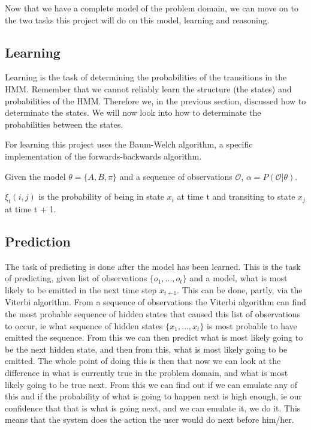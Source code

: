 Now that we have a complete model of the problem domain, we can move on to the two tasks this project will do on this model, learning and reasoning.

\subsection{Learning}
Learning is the task of determining the probabilities of the transitions in the HMM. Remember that we cannot reliably learn the structure (the states) and probabilities of the HMM. Therefore we, in the previous section, discussed how to determinate the states. We will now look into how to determinate the probabilities between the states.

For learning this project uses the Baum-Welch algorithm, a specific implementation of the forwards-backwards algorithm.

Given the model $\theta = \{A, B, \pi\}$ and a sequence of observations $\mathcal{O}$, $\alpha = P(\mathcal{O}|\theta)$.

$\xi_t (i, j)$ is the probability of being in state $x_i$ at time t and transiting to state $x_j$ at
time t + 1.



\subsection{Prediction}\label{sub:Prediction}
The task of predicting is done after the model has been learned. This is the task of predicting, given list of observations $\{o_1,\dots,o_t\}$ and a model, what is most likely to be emitted in the next time step $x_{t+1}$. This can be done, partly, via the Viterbi algorithm. From a sequence of observations the Viterbi algorithm can find the most probable sequence of hidden states that caused this list of observations to occur, ie what sequence of hidden states $\{x_1,\dots,x_t\}$ is most probable to have emitted the sequence. From this we can then predict what is most likely going to be the next hidden state, and then from this, what is most likely going to be emitted. The whole point of doing this is then that now we can look at the difference in what is currently true in the problem domain, and what is most likely going to be true next. From this we can find out if we can emulate any of this and if the probability of what is going to happen next is high enough, ie our confidence that that is what is going next, and we can emulate it, we do it. This means that the system does the action the user would do next before him/her.
